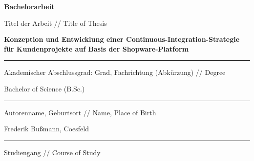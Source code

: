 
\begin{titlepage}
        \hspace{2.16cm}
        \vspace{1.6cm}

        \begingroup
        \fontsize{44pt}{46pt}\selectfont
        {\bfseries Bachelorarbeit}
        \endgroup

        \vskip 1.44cm

        \begingroup
        \fontsize{8pt}{6pt}\selectfont
        Titel der Arbeit // Title of Thesis
        \endgroup

        \begingroup
        \fontsize{12pt}{14pt}\selectfont
        {\bfseries Konzeption und Entwicklung einer Continuous-Integration-Strategie für Kundenprojekte auf Basis der
        Shopware-Platform\par}
        \endgroup
        \vskip -0.1cm

        \noindent\rule{14.4cm}{0.4pt}

        \vskip 0.05cm

        \begingroup
        \fontsize{8pt}{6pt}\selectfont
        Akademischer Abschlussgrad: Grad, Fachrichtung (Abkürzung) // Degree
        \endgroup

        \vskip -0.05cm

        \begingroup
        \fontsize{12pt}{14pt}\selectfont
        Bachelor of Science (B.Sc.)
        \endgroup
        \vskip -0.1cm

        \noindent\rule{14.4cm}{0.4pt}

        \vskip 0.05cm

        \begingroup
        \fontsize{8pt}{6pt}\selectfont
        Autorenname, Geburtsort // Name, Place of Birth
        \endgroup

        \vskip -0.05cm

        \begingroup
        \fontsize{12pt}{14pt}\selectfont
        Frederik Bußmann, Coesfeld
        \endgroup
        \vskip -0.1cm

        \noindent\rule{14.4cm}{0.4pt}

        \vskip 0.05cm

        \begingroup
        \fontsize{8pt}{6pt}\selectfont
        Studiengang // Course of Study
        \endgroup


\end{titlepage}
